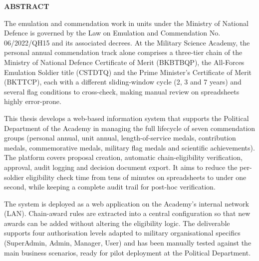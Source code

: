 \documentclass[../DoAn.tex]{subfiles}
\begin{document}
\begin{center}
    \Large{\textbf{ABSTRACT}}\\
\end{center}
\vspace{1cm}

The emulation and commendation work in units under the Ministry of National Defence is governed by the Law on Emulation and Commendation No. 06/2022/QH15 and its associated decrees. At the Military Science Academy, the personal annual commendation track alone comprises a three-tier chain of the Ministry of National Defence Certificate of Merit (BKBTBQP), the All-Forces Emulation Soldier title (CSTDTQ) and the Prime Minister's Certificate of Merit (BKTTCP), each with a different sliding-window cycle (2, 3 and 7 years) and several flag conditions to cross-check, making manual review on spreadsheets highly error-prone.

This thesis develops a web-based information system that supports the Political Department of the Academy in managing the full lifecycle of seven commendation groups (personal annual, unit annual, length-of-service medals, contribution medals, commemorative medals, military flag medals and scientific achievements). The platform covers proposal creation, automatic chain-eligibility verification, approval, audit logging and decision document export. It aims to reduce the per-soldier eligibility check time from tens of minutes on spreadsheets to under one second, while keeping a complete audit trail for post-hoc verification.

The system is deployed as a web application on the Academy's internal network (LAN). Chain-award rules are extracted into a central configuration so that new awards can be added without altering the eligibility logic. The deliverable supports four authorisation levels adapted to military organisational specifics (SuperAdmin, Admin, Manager, User) and has been manually tested against the main business scenarios, ready for pilot deployment at the Political Department.
\end{document}
